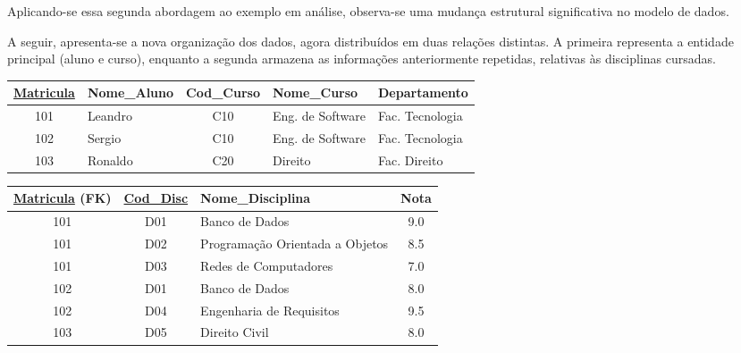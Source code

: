 \begin{tcolorbox}[breakable, colback=blue!5,colframe=blue!40!black,title=Situação exemplo]

    Aplicando-se essa segunda abordagem ao exemplo em análise, observa-se uma mudança estrutural significativa no modelo de dados. 

    A seguir, apresenta-se a nova organização dos dados, agora distribuídos em duas relações distintas. A primeira representa a entidade principal (aluno e curso), enquanto a segunda armazena as informações anteriormente repetidas, relativas às disciplinas cursadas.

    \vspace{0.4cm}

    \centering
    \renewcommand{\arraystretch}{1.2}

    \begin{adjustbox}{max width=\textwidth}
    \begin{tabular}{|c|l|c|l|l|}
    \hline
    \textbf{\underline{Matricula}} & \textbf{Nome\_Aluno} & \textbf{Cod\_Curso} & \textbf{Nome\_Curso} & \textbf{Departamento} \\ \hline
    101 & Leandro & C10 & Eng. de Software & Fac. Tecnologia \\ \hline
    102 & Sergio & C10 & Eng. de Software & Fac. Tecnologia \\ \hline
    103 & Ronaldo & C20 & Direito & Fac. Direito \\ \hline
    \end{tabular}
\end{adjustbox}
    \vspace{0.3cm}
    \label{tab:principal_grupo_repetitivo}

    \vspace{0.5cm}

    \begin{adjustbox}{max width=\textwidth}
    \begin{tabular}{|c|c|l|c|}
    \hline
    \textbf{\underline{Matricula} (FK)} & \textbf{\underline{Cod\_Disc}} & \textbf{Nome\_Disciplina} & \textbf{Nota} \\ \hline
    101 & D01 & Banco de Dados & 9.0 \\ \hline
    101 & D02 & Programação Orientada a Objetos & 8.5 \\ \hline
    101 & D03 & Redes de Computadores & 7.0 \\ \hline
    102 & D01 & Banco de Dados & 8.0 \\ \hline
    102 & D04 & Engenharia de Requisitos & 9.5 \\ \hline
    103 & D05 & Direito Civil & 8.0 \\ \hline
    \end{tabular}
\end{adjustbox}
    \vspace{0.3cm}
    \label{tab:grupo_repetitivo_extraido}


\end{tcolorbox}
